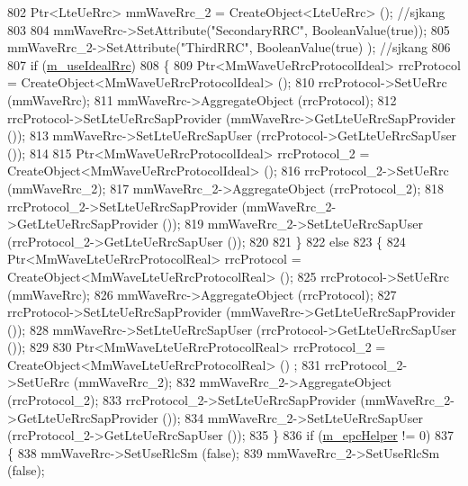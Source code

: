 \begin{DoxyCode}
802         Ptr<LteUeRrc> mmWaveRrc\_2 = CreateObject<LteUeRrc> (); \textcolor{comment}{//sjkang}
803 
804         mmWaveRrc->SetAttribute(\textcolor{stringliteral}{"SecondaryRRC"}, BooleanValue(\textcolor{keyword}{true}));
805         mmWaveRrc\_2->SetAttribute(\textcolor{stringliteral}{"ThirdRRC"}, BooleanValue(\textcolor{keyword}{true}) ); \textcolor{comment}{//sjkang}
806 
807         \textcolor{keywordflow}{if} (\hyperlink{classns3_1_1MmWaveHelper_ad41fdb2996a6f53385b146bb60f476dc}{m\_useIdealRrc})
808         \{
809                 Ptr<MmWaveUeRrcProtocolIdeal> rrcProtocol = CreateObject<MmWaveUeRrcProtocolIdeal> ();
810                 rrcProtocol->SetUeRrc (mmWaveRrc);
811                 mmWaveRrc->AggregateObject (rrcProtocol);
812                 rrcProtocol->SetLteUeRrcSapProvider (mmWaveRrc->GetLteUeRrcSapProvider ());
813                 mmWaveRrc->SetLteUeRrcSapUser (rrcProtocol->GetLteUeRrcSapUser ());
814 
815                 Ptr<MmWaveUeRrcProtocolIdeal> rrcProtocol\_2 = CreateObject<MmWaveUeRrcProtocolIdeal> ();
816                 rrcProtocol\_2->SetUeRrc (mmWaveRrc\_2);
817                 mmWaveRrc\_2->AggregateObject (rrcProtocol\_2);
818                 rrcProtocol\_2->SetLteUeRrcSapProvider (mmWaveRrc\_2->GetLteUeRrcSapProvider ());
819                 mmWaveRrc\_2->SetLteUeRrcSapUser (rrcProtocol\_2->GetLteUeRrcSapUser ());
820 
821         \}
822         \textcolor{keywordflow}{else}
823         \{
824                 Ptr<MmWaveLteUeRrcProtocolReal> rrcProtocol = CreateObject<MmWaveLteUeRrcProtocolReal> ();
825                 rrcProtocol->SetUeRrc (mmWaveRrc);
826                 mmWaveRrc->AggregateObject (rrcProtocol);
827                 rrcProtocol->SetLteUeRrcSapProvider (mmWaveRrc->GetLteUeRrcSapProvider ());
828                 mmWaveRrc->SetLteUeRrcSapUser (rrcProtocol->GetLteUeRrcSapUser ());
829 
830                 Ptr<MmWaveLteUeRrcProtocolReal> rrcProtocol\_2 = CreateObject<MmWaveLteUeRrcProtocolReal> ()
      ;
831                 rrcProtocol\_2->SetUeRrc (mmWaveRrc\_2);
832                 mmWaveRrc\_2->AggregateObject (rrcProtocol\_2);
833                 rrcProtocol\_2->SetLteUeRrcSapProvider (mmWaveRrc\_2->GetLteUeRrcSapProvider ());
834                 mmWaveRrc\_2->SetLteUeRrcSapUser (rrcProtocol\_2->GetLteUeRrcSapUser ());
835         \}
836         \textcolor{keywordflow}{if} (\hyperlink{classns3_1_1MmWaveHelper_a03b33f9a2480a4cdd8ffe697ccc08e9e}{m\_epcHelper} != 0)
837         \{
838                 mmWaveRrc->SetUseRlcSm (\textcolor{keyword}{false});
839                 mmWaveRrc\_2->SetUseRlcSm (\textcolor{keyword}{false});

\end{DoxyCode}
